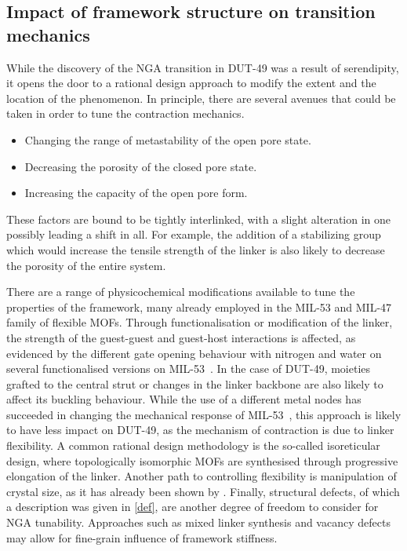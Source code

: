 
\subsection{Impact of framework structure on transition mechanics}%
\label{dut:comparison}

While the discovery of the NGA transition in DUT-49 was a result 
of serendipity, it opens the door to a rational design approach 
to modify the extent and the location of the phenomenon. In principle,
there are several avenues that could be taken in order to tune the 
contraction mechanics.
\begin{itemize}
    \item Changing the range of metastability of the open pore state.
    \item Decreasing the porosity of the closed pore state.
    \item Increasing the capacity of the open pore form.
\end{itemize}
These factors are bound to be tightly interlinked, with a slight 
alteration in one possibly leading a shift in all. For example, the 
addition of a stabilizing group which would increase the tensile 
strength of the linker is also likely to decrease the porosity 
of the entire system.

There are a range of physicochemical modifications available to 
tune the properties of the framework, many already employed in the
MIL-53 and MIL-47 family of flexible MOFs.
Through functionalisation or modification of the linker, the 
strength of the guest-guest
and guest-host interactions is affected, as evidenced by the different
gate opening behaviour with nitrogen and water on several functionalised
versions on MIL-53~\cite{biswasNewFunctionalizedFlexible2011}.
In the case of DUT-49, moieties grafted to the central strut or changes
in the linker backbone are also likely to affect its buckling behaviour.
While the use of a different metal nodes has succeeded in
changing the mechanical response of 
MIL-53~\cite{yotImpactMetalCentre2016}, this 
approach is likely to have less impact on DUT-49, as the mechanism of 
contraction is due to linker flexibility.
A common rational design methodology is the so-called isoreticular design,
where topologically isomorphic MOFs are synthesised 
through progressive elongation
of the linker. Another path to controlling flexibility is
manipulation of crystal size, as it has already been shown 
by \citet{krauseEffectCrystalliteSize2018}.
Finally, structural defects, of which a description was given 
in \autoref{def}, are another degree of freedom to consider for NGA 
tunability. Approaches such as mixed linker synthesis and vacancy defects
may allow for fine-grain influence of framework stiffness.

